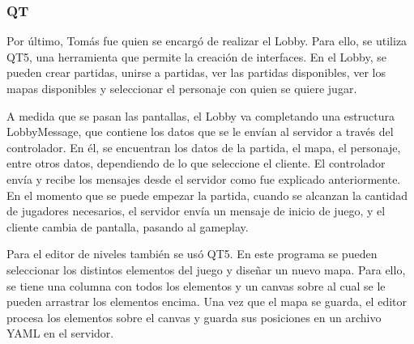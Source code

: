 \documentclass[titlepage,a4paper]{article}
\newcounter{subsubsubsection}[subsubsection]
\begin{document}
\subsubsection{QT}

Por último, Tomás fue quien se encargó de realizar el Lobby. Para ello, se utiliza QT5, una herramienta que permite la creación de interfaces. En el Lobby, se pueden crear partidas, unirse a partidas, ver las partidas disponibles, ver los mapas disponibles y seleccionar el personaje con quien se quiere jugar.

A medida que se pasan las pantallas, el Lobby va completando una estructura LobbyMessage, que contiene los datos que se le envían al servidor a través del controlador. En él, se encuentran los datos de la partida, el mapa, el personaje, entre otros datos, dependiendo de lo que seleccione el cliente. El controlador envía y recibe los mensajes desde el servidor como fue explicado anteriormente. En el momento que se puede empezar la partida, cuando se alcanzan la cantidad de jugadores necesarios, el servidor envía un mensaje de inicio de juego, y el cliente cambia de pantalla, pasando al gameplay.

Para el editor de niveles también se usó QT5. En este programa se pueden seleccionar los distintos elementos del juego y diseñar un nuevo mapa. Para ello, se tiene una columna con todos los elementos y un canvas sobre al cual se le pueden arrastrar los elementos encima. Una vez que el mapa se guarda, el editor procesa los elementos sobre el canvas y guarda sus posiciones en un archivo YAML en el servidor. 
\end{document}
